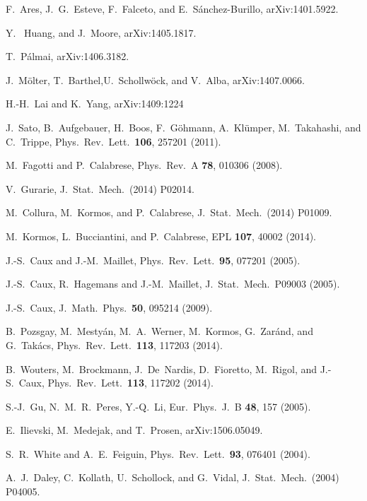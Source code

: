 \documentclass[twocolumn,superscriptaddress,prb,10pt]{revtex4-1}
\begin{document}
\begin{thebibliography}{99}
F.~Ares, J.~G.~Esteve, F.~Falceto, and E.~S\'anchez-Burillo, 
arXiv:1401.5922.

Y.~ Huang, and J.~Moore,  arXiv:1405.1817.

T.~P\'almai, arXiv:1406.3182.

J.~M\"olter, T.~Barthel,U.~Schollw\"ock, and V.~Alba, 
arXiv:1407.0066. 

H.-H.~Lai and K.~Yang, arXiv:1409:1224


J.~Sato, B.~Aufgebauer, H.~Boos, F.~G\"ohmann, A.~Kl\"umper, 
M.~Takahashi, and C.~Trippe, Phys.\ Rev.\ Lett.\ {\bf 106}, 257201 
(2011). 

M.~Fagotti and P.~Calabrese, Phys.\ Rev.\ A {\bf 78}, 010306 (2008).

V.~Gurarie, J.\ Stat.\ Mech.\ (2014) P02014. 

M.~Collura, M.~Kormos, and P.~Calabrese, J.\ Stat.\ Mech.\ (2014) P01009. 

M.~Kormos, L.~Bucciantini, and P.~Calabrese, EPL {\bf 107}, 40002 (2014). 

J.-S.~Caux and J.-M.~Maillet, Phys.\ Rev.\ Lett.\ {\bf 95}, 077201 (2005).

J.-S.~Caux, R.~Hagemans and J.-M.~Maillet, J.\ Stat.\ Mech.\ P09003 (2005). 

J.-S.~Caux, J.\ Math.\ Phys.\ {\bf 50}, 095214 (2009).


B.~Pozsgay, M.~Mesty\'an, M.~A.~Werner, M.~Kormos, G.~Zar\'and, and G.~Tak\'acs,
Phys.\ Rev.\ Lett.\ {\bf 113}, 117203 (2014). 

B.~Wouters, M.~Brockmann, J.~De~Nardis, D.~Fioretto, M.~Rigol, and J.-S.~Caux, 
Phys.\ Rev.\ Lett.\ {\bf 113}, 117202 (2014). 

S.-J.~Gu, N.~M.~R.~Peres, Y.-Q.~Li, Eur.\ Phys.\ J.\ B {\bf 48}, 157 (2005). 

E.~Ilievski, M.~Medejak, and T.~Prosen, arXiv:1506.05049.

S.~R.~White and A.~E.~Feiguin, Phys.\ Rev.\ Lett.\ {\bf 93}, 076401 (2004).

A.~J.~Daley, C.~Kollath, U.~Schollock, and G.~Vidal, J.\ Stat.\ Mech.\ (2004) P04005.



\end{thebibliography}
\end{document}
